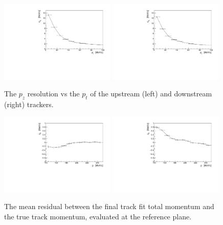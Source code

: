   \begin{figure}[p]
   \begin{center}
     \includegraphics[width=0.49\textwidth, angle=0]{08-Performance/upstream_pz_resolution_pt.pdf}
     \includegraphics[width=0.49\textwidth, angle=0]{08-Performance/downstream_pz_resolution_pt.pdf}
     \caption{\label{fig:PtPzResolKalman} The $p_z$ resolution vs the $p_{t}$ of the upstream (left) and downstream (right) trackers.}
   \end{center}
  \end{figure}

  \begin{figure}[p]
    \begin{center}
      \includegraphics[width=0.49\textwidth, angle=0]{08-Performance/upstream_p_bias_p.pdf}
      \includegraphics[width=0.49\textwidth, angle=0]{08-Performance/downstream_p_bias_p.pdf}
      \caption{\label{fig:pBiasKalman} The mean residual between the final track fit total momentum and the true track momentum, evaluated at the reference plane.}
    \end{center}
  \end{figure}
